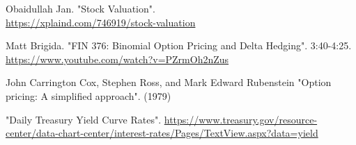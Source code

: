 \documentclass[12pt, letterpaper]{article}
\begin{document}
\begin{thebibliography}{9}
    Obaidullah Jan.
    "Stock Valuation".
    \\
    \href{https://xplaind.com/746919/stock-valuation}{https://xplaind.com/746919/stock-valuation}

    Matt Brigida.
    "FIN 376: Binomial Option Pricing and Delta Hedging".
    3:40-4:25.
    \\
    \href{https://www.youtube.com/watch?v=PZrmOh2nZus}{https://www.youtube.com/watch?v=PZrmOh2nZus}

    John Carrington Cox, Stephen Ross, and Mark Edward Rubenstein
    "Option pricing: A simplified approach".
    (1979)

    "Daily Treasury Yield Curve Rates".
    \href{https://www.treasury.gov/resource-center/data-chart-center/interest-rates/Pages/TextView.aspx?data=yield}{https://www.treasury.gov/resource-center/data-chart-center/interest-rates/Pages/TextView.aspx?data=yield}


\end{thebibliography}
\end{document}
